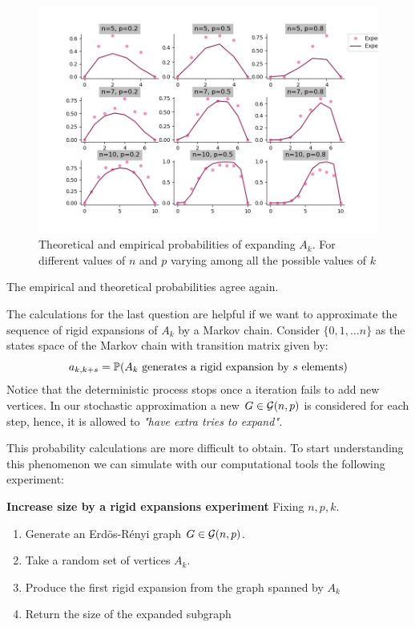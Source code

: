 \begin{figure}[h!]
	\centering
	\includegraphics[scale=0.55]{Python/Figures/Expansion-probability.png}
	\caption{Theoretical and empirical probabilities of expanding $A_{k}$. For different values of $n$ and $p$ varying among all the possible values of $k$}
\end{figure}

The empirical and theoretical probabilities agree again.
\vspace{0.3cm}

\vspace{-0.3cm}

The calculations for the last question are helpful if we want to approximate the sequence of rigid expansions of $A_{k}$ by a Markov chain. Consider $\{0,1, \dots n\}$ as the states space of the Markov chain with transition matrix given by:
$$ a_{k,k+s} = \P(A_{k} \text{ generates a rigid expansion by } s \text{ elements})$$
Notice that the deterministic process stops once a iteration fails to add new vertices. In our stochastic approximation a new $G \in \G(n,p)$ is considered for each step, hence, it is allowed to \textit{"have extra tries to expand".}

This probability calculations are more difficult to obtain. To start understanding this phenomenon we can simulate with our computational tools the following experiment:
 
\begin{cajita}                                                                                                                                                                
\textbf{Increase size by a rigid expansions experiment} \hfill \break
Fixing $n,p,k$.
\begin{enumerate}
\item Generate an Erdös-Rényi graph $G\in \G(n,p)$.
\item Take a random set of vertices $A_{k}$.
\item Produce the first rigid expansion from the graph spanned by $A_{k}$
\item Return the size of the expanded subgraph
\end{enumerate}
\end{cajita}

